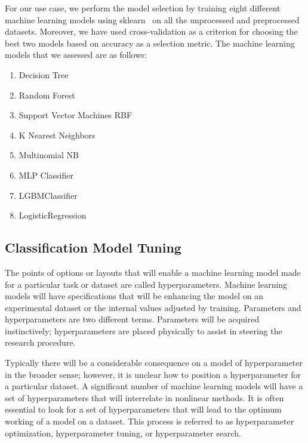 \documentclass[a4paper,singleside,12pt]{report} %
\begin{document}
				For our use case, we perform the model selection by training eight different machine learning models using sklearn~\cite{sklearn-api} on all the unprocessed and preprocessed datasets. 
				Moreover, we have used cross-validation as a criterion for choosing the best two models based on accuracy as a selection metric. The machine learning models that we assessed are as follows: 
				\begin{enumerate}
				\item Decision Tree~\cite{quinlan1986induction,rokach2005decision}
				\item Random Forest~\cite{breiman2001random,liu2012new,livingston2005implementation}
				\item Support Vector Machines RBF~\cite{steinwart2008support,hearst1998support,campbell2011learning,liu2011feature}
				\item K Nearest Neighbors~\cite{goldberger2004neighbourhood, kramer2013k,zhang2016introduction}
				\item Multinomial NB~\cite{10.5555/1394399,kibriya2004multinomial}
				\item MLP Classifier~\cite{hinton1990connectionist, }
				\item LGBMClassifier~\cite{alzamzami2020light}
				\item LogisticRegression~\cite{dreiseitl2002logistic}
				\end{enumerate}


			\subsection{Classification Model Tuning}

				The points of options or layouts that will enable a machine learning model made for a particular task or dataset are called hyperparameters. 
				Machine learning models will have specifications that will be enhancing the model on an experimental dataset or the internal values adjusted by training.
				Parameters and hyperparameters are two different terms. Parameters will be acquired instinctively; hyperparameters are placed physically to assist in steering the research procedure. 
				
				Typically there will be a considerable consequence on a model of hyperparameter in the broader sense; however, it is unclear how to position a hyperparameter for a particular dataset. 
				A significant number of machine learning models will have a set of hyperparameters that will interrelate in nonlinear methods. 
				It is often essential to look for a set of hyperparameters that will lead to the optimum working of a model on a dataset. 
				This process is referred to as hyperparameter optimization, hyperparameter tuning, or hyperparameter search. 
				
\end{document}
